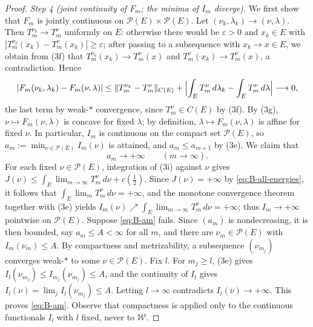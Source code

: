 \documentclass[12pt,oneside,a4paper]{article}
\theoremstyle{mytheorem}
\theoremstyle{remark}
\theoremstyle{definition}
\begin{document}
\begin{proof}
\smallskip\noindent\emph{Step 4 (joint continuity of $F_m$; the
minima of $I_m$ diverge).}
We first show that $F_m$ is jointly continuous on
$\mathcal{P}(E)\times\mathcal{P}(E)$.  Let
$(\nu_k,\lambda_k)\to(\nu,\lambda)$.  Then $T^{\nu_k}_m\to T^\nu_m$
uniformly on $E$: otherwise there would be $\varepsilon>0$ and
$x_k\in E$ with $|T^{\nu_k}_m(x_k)-T^\nu_m(x_k)|\ge\varepsilon$; after passing
to a subsequence with $x_k\to x\in E$, we obtain from (3f) that
$T^{\nu_k}_m(x_k)\to T^\nu_m(x)$ and $T^\nu_m(x_k)\to T^\nu_m(x)$, a
contradiction.  Hence
\[
 |F_m(\nu_k,\lambda_k)-F_m(\nu,\lambda)|
 \le\|T^{\nu_k}_m-T^\nu_m\|_{C(E)}
 +\Bigl|\int_ET^\nu_m\,d\lambda_k-\int_ET^\nu_m\,d\lambda\Bigr|
 \longrightarrow0,
\]
the last term by weak-\(*\) convergence, since $T^\nu_m\in C(E)$ by
(3f).  By (3g), $\nu\mapsto F_m(\nu,\lambda)$ is concave for fixed
$\lambda$; by definition, $\lambda\mapsto F_m(\nu,\lambda)$ is affine
for fixed $\nu$.  In particular, $I_m$ is continuous on the compact set
$\mathcal{P}(E)$, so
$a_m:=\min_{\nu\in\mathcal{P}(E)}I_m(\nu)$ is attained, and
$a_m\le a_{m+1}$ by (3e).  We claim that
\begin{equation}
 a_m\longrightarrow+\infty\qquad(m\to\infty).
 \label{eq:B-am}
\end{equation}
For each fixed $\nu\in\mathcal{P}(E)$, integration of (3i) against
$\nu$ gives
\(J(\nu)\le\int_E\lim_{m\to\infty}T^\nu_m\,d\nu+c(\tfrac12)\).
Since $J(\nu)=+\infty$ by \eqref{eq:B-all-energies}, it follows that
$\int_E\lim_mT^\nu_m\,d\nu=+\infty$, and the monotone convergence
theorem together with (3e) yields
\(I_m(\nu)\nearrow\int_E\lim_{m\to\infty}T^\nu_m\,d\nu=+\infty\);
thus $I_m\to+\infty$ pointwise on $\mathcal{P}(E)$.  Suppose
\eqref{eq:B-am} fails.  Since $(a_m)$ is nondecreasing, it is then
bounded, say $a_m\le A<\infty$ for all $m$, and there are
$\nu_m\in\mathcal{P}(E)$ with $I_m(\nu_m)\le A$.  By compactness and
metrizability, a subsequence $(\nu_{m_j})$ converges weak-\(*\) to some
$\nu\in\mathcal{P}(E)$.  Fix $l$.  For $m_j\ge l$, (3e) gives
$I_l(\nu_{m_j})\le I_{m_j}(\nu_{m_j})\le A$, and the continuity of
$I_l$ gives $I_l(\nu)=\lim_jI_l(\nu_{m_j})\le A$.  Letting
$l\to\infty$ contradicts $I_l(\nu)\to+\infty$.  This proves
\eqref{eq:B-am}.  Observe that compactness is applied only to
the continuous functionals $I_l$ with $l$ fixed, never to
$\mathcal{W}$.


\end{proof}
\end{document}
